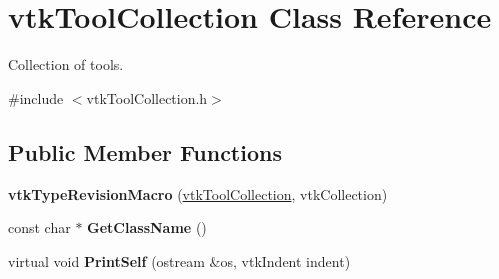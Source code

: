\hypertarget{classvtkToolCollection}{
\section{vtkToolCollection Class Reference}
\label{classvtkToolCollection}
}


Collection of tools.  


{\ttfamily \#include $<$vtkToolCollection.h$>$}\subsection*{Public Member Functions}
\begin{DoxyCompactItemize}
\item 
\hypertarget{classvtkToolCollection_a86b0f1336ec168b8e8da4c8b103a8b4f}{
{\bfseries vtkTypeRevisionMacro} (\hyperlink{classvtkToolCollection}{vtkToolCollection}, vtkCollection)}
\label{classvtkToolCollection_a86b0f1336ec168b8e8da4c8b103a8b4f}

\item 
\hypertarget{classvtkToolCollection_a37e5cbc34a1fc7d2d7052e3f98a1a0d7}{
const char $\ast$ {\bfseries GetClassName} ()}
\label{classvtkToolCollection_a37e5cbc34a1fc7d2d7052e3f98a1a0d7}

\item 
\hypertarget{classvtkToolCollection_ade9221fb1eb1d55b01b051954ffd2d54}{
virtual void {\bfseries PrintSelf} (ostream \&os, vtkIndent indent)}
\label{classvtkToolCollection_ade9221fb1eb1d55b01b051954ffd2d54}


\end{DoxyCompactItemize}
